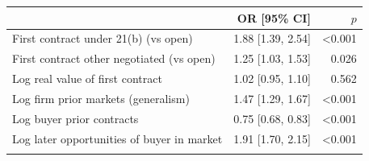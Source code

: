 \begin{tabular}{@{}lrr@{}}
\toprule
 & OR [95\% CI] & $p$\\
\midrule
First contract under 21(b) (vs open) & 1.88 [1.39, 2.54] & <0.001\\
First contract other negotiated (vs open) & 1.25 [1.03, 1.53] & 0.026\\
Log real value of first contract & 1.02 [0.95, 1.10] & 0.562\\
Log firm prior markets (generalism) & 1.47 [1.29, 1.67] & <0.001\\
Log buyer prior contracts & 0.75 [0.68, 0.83] & <0.001\\
Log later opportunities of buyer in market & 1.91 [1.70, 2.15] & <0.001\\
\botrule
\end{tabular}
